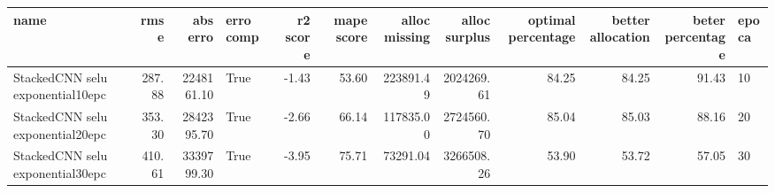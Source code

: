 \begin{tabular}{lrrlrrrrrrrl}
\toprule
name & rmse & abs erro & erro comp & r2 score & mape score & alloc missing & alloc surplus & optimal percentage & better allocation & beter percentage & epoca \\
\midrule
StackedCNN selu exponential10epc & 287.88 & 2248161.10 & True & -1.43 & 53.60 & 223891.49 & 2024269.61 & 84.25 & 84.25 & 91.43 & 10 \\
StackedCNN selu exponential20epc & 353.30 & 2842395.70 & True & -2.66 & 66.14 & 117835.00 & 2724560.70 & 85.04 & 85.03 & 88.16 & 20 \\
StackedCNN selu exponential30epc & 410.61 & 3339799.30 & True & -3.95 & 75.71 & 73291.04 & 3266508.26 & 53.90 & 53.72 & 57.05 & 30 \\
\bottomrule
\end{tabular}
